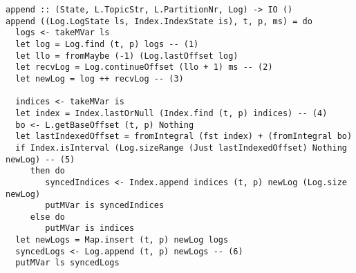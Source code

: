 \begin{lstlisting}[caption={Append function exposed by LogManager}]
append :: (State, L.TopicStr, L.PartitionNr, Log) -> IO ()
append ((Log.LogState ls, Index.IndexState is), t, p, ms) = do
  logs <- takeMVar ls
  let log = Log.find (t, p) logs -- (1)
  let llo = fromMaybe (-1) (Log.lastOffset log)
  let recvLog = Log.continueOffset (llo + 1) ms -- (2)
  let newLog = log ++ recvLog -- (3)

  indices <- takeMVar is
  let index = Index.lastOrNull (Index.find (t, p) indices) -- (4)
  bo <- L.getBaseOffset (t, p) Nothing
  let lastIndexedOffset = fromIntegral (fst index) + (fromIntegral bo)
  if Index.isInterval (Log.sizeRange (Just lastIndexedOffset) Nothing newLog) -- (5)
     then do
        syncedIndices <- Index.append indices (t, p) newLog (Log.size newLog)
        putMVar is syncedIndices
     else do
        putMVar is indices
  let newLogs = Map.insert (t, p) newLog logs
  syncedLogs <- Log.append (t, p) newLogs -- (6)
  putMVar ls syncedLogs
\end{lstlisting}


